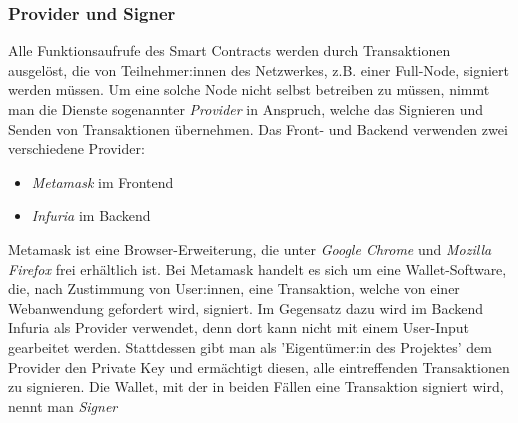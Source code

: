 \subsubsection{Provider und Signer}
Alle Funktionsaufrufe des Smart Contracts werden durch Transaktionen ausgelöst, die von Teilnehmer:innen des Netzwerkes, z.B. einer Full-Node, signiert werden müssen. Um eine solche Node nicht selbst betreiben zu müssen, nimmt man die Dienste sogenannter \emph{Provider} in Anspruch, welche das Signieren und Senden von Transaktionen übernehmen. Das Front- und Backend verwenden zwei verschiedene Provider:
\begin{itemize}
	\item \emph{Metamask} im Frontend
	\item \emph{Infuria} im Backend
\end{itemize}
Metamask ist eine Browser-Erweiterung, die unter \emph{Google Chrome} und \emph{Mozilla Firefox} frei erhältlich ist. Bei Metamask handelt es sich um eine Wallet-Software, die, nach Zustimmung von User:innen, eine Transaktion, welche von einer Webanwendung gefordert wird, signiert.
Im Gegensatz dazu wird im Backend Infuria als Provider verwendet, denn dort kann nicht mit einem User-Input gearbeitet werden. Stattdessen gibt man als 'Eigentümer:in des Projektes' dem Provider den Private Key und ermächtigt diesen, alle eintreffenden Transaktionen zu signieren. Die Wallet, mit der in beiden Fällen eine Transaktion signiert wird, nennt man \emph{Signer}
